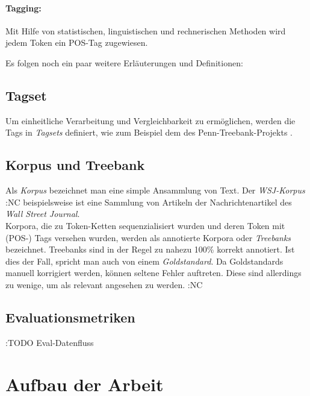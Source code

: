 \paragraph{Tagging:} Mit Hilfe von statistischen, linguistischen und rechnerischen Methoden wird jedem Token ein POS-Tag zugewiesen. 

Es folgen noch ein paar weitere Erläuterungen und Definitionen:

\subsection{Tagset}
\label{sec:intro:pos:tagset}

Um einheitliche Verarbeitung und Vergleichbarkeit zu ermöglichen, werden die Tags in \textit{Tagsets} definiert, wie zum Beispiel dem des Penn-Treebank-Projekts \linebreak \cite{Web:PennBank:2003}.

\subsection{Korpus und Treebank}
\label{sec:intro:pos:corpus}

Als \textit{Korpus} bezeichnet man eine simple Ansammlung von Text. Der \textit{WSJ-Korpus}  :NC beispielsweise ist eine Sammlung von Artikeln der Nachrichtenartikel des \textit{Wall Street Journal}.
\\
Korpora, die zu Token-Ketten sequenzialisiert wurden und deren Token mit (POS-) Tags versehen wurden, werden als annotierte Korpora oder \textit{Treebanks} bezeichnet. Treebanks sind in der Regel zu nahezu 100\% korrekt annotiert. Ist dies der Fall, spricht man auch von einem \textit{Goldstandard}. Da Goldstandards manuell korrigiert werden, können seltene Fehler auftreten. Diese sind allerdings zu wenige, um als relevant angesehen zu werden. :NC

\subsection{Evaluationsmetriken}
\label{sec:intro:pos:metrics}



:TODO Eval-Datenfluss




\section{Aufbau der Arbeit}
\label{sec:intro:structure}


